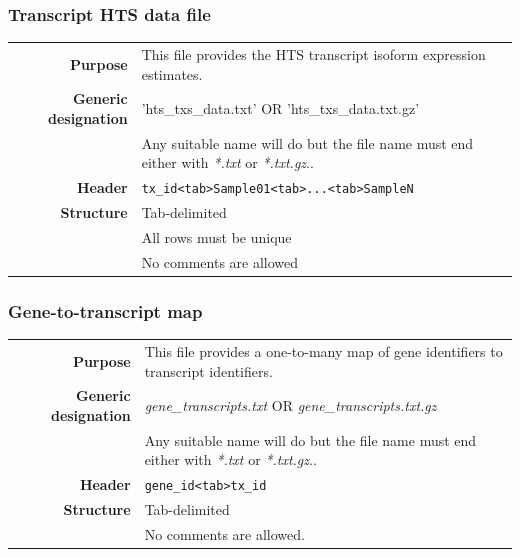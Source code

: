 \documentclass[a4paper,12pt]{article}
\begin{document}
\subsubsection{Transcript HTS data file}
\label{tiep:transcript}

\begin{tabular}{rp{12cm}}
\textbf{Purpose} & This file provides the HTS transcript isoform expression estimates. \\
\textbf{Generic designation} & 'hts\_txs\_data.txt' OR 'hts\_txs\_data.txt.gz' \\
  & Any suitable name will do but the file name must end either with \textit{*.txt} or \textit{*.txt.gz}.. \\
\textbf{Header} & \texttt{tx\_id\textless tab\textgreater Sample01\textless tab\textgreater...\textless tab\textgreater SampleN} \\
\textbf{Structure} & Tab-delimited \\
  & All rows must be unique \\
  & No comments are allowed \\
\end{tabular}

\subsubsection{Gene-to-transcript map}
\label{tiep:gene}

\begin{tabular}{rp{12cm}}
\textbf{Purpose} & This file provides a one-to-many map of gene identifiers to transcript  identifiers. \\
\textbf{Generic designation} & \textit{gene\_transcripts.txt} OR \textit{gene\_transcripts.txt.gz} \\
  & Any suitable name will do but the file name must end either with \textit{*.txt} or \textit{*.txt.gz}.. \\
\textbf{Header} & \texttt{gene\_id\textless tab\textgreater tx\_id} \\
\textbf{Structure} & Tab-delimited \\
  & No comments are allowed. \\
\end{tabular}
\end{document}
